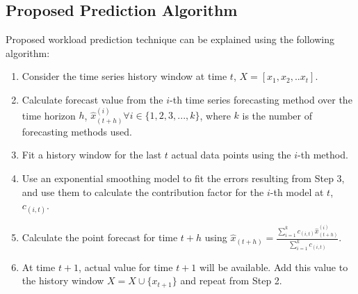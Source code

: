 \subsection{Proposed Prediction Algorithm}
Proposed workload prediction technique can be explained using the following algorithm:
\begin{enumerate}
\item Consider the time series history window at time $t$, $X=[x_{1},x_{2},.. x_{t}]$.
\item Calculate forecast value from the $i$-th time series forecasting method over the time horizon $h$, $\hat{x}_{(t+h)}^{(i)} \forall i \in \{1,2,3,...,k\}$, where $k$ is the number of forecasting methods used.
\item Fit a history window for the last $t$ actual data points using the $i$-th method.
\item Use an exponential smoothing model to fit the errors resulting from Step 3, and use them to calculate the contribution factor for the $i$-th model at $t$, $c_{(i,t)}$.
\item Calculate the point forecast for time $t+h$ using
$\hat{x}_{(t+h)}= \frac{\sum_{i=1}^{k}c_{(i,t)} \hat{x}_{(t+h)}^{(i)}}{\sum_{i=1}^{k}c_{(i,t)}}$.
\item At time $t+1$, actual value for time $t+1$ will be available. Add this value to the history window $X=X\cup \{x_{t+1}\}$ and repeat from Step 2.
\end{enumerate}
